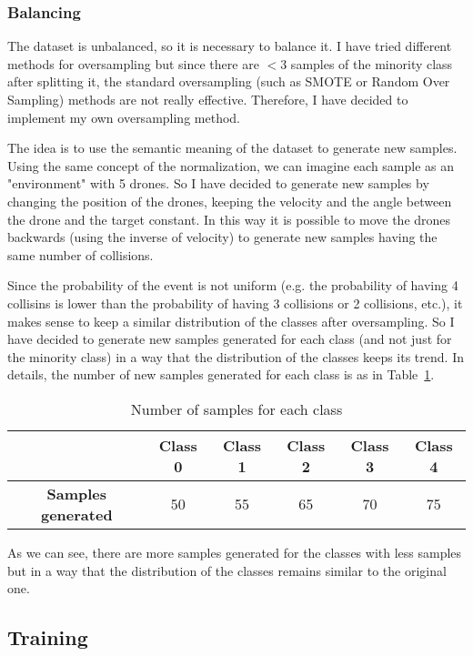 \subsubsection{Balancing} \label{sec:preprocessing-balancing}
The dataset is unbalanced, so it is necessary to balance it.
I have tried different methods for oversampling but since there are $<3$ samples of the minority class after splitting it, the standard oversampling (such as SMOTE or Random Over Sampling) methods are not really effective.
Therefore, I have decided to implement my own oversampling method.

The idea is to use the semantic meaning of the dataset to generate new samples.
Using the same concept of the normalization, we can imagine each sample as an "environment" with 5 drones.
So I have decided to generate new samples by changing the position of the drones, keeping the velocity and the angle between the drone and the target constant.
In this way it is possible to move the drones backwards (using the inverse of velocity) to generate new samples having the same number of collisions.

Since the probability of the event is not uniform (e.g. the probability of having 4 collisins is lower than the probability of having 3 collisions or 2 collisions, etc.), it makes sense to keep a similar distribution of the classes after oversampling.
So I have decided to generate new samples generated for each class (and not just for the minority class) in a way that the distribution of the classes keeps its trend.
In details, the number of new samples generated for each class is as in Table~\ref{tab:preprocessing-balancing}.
\begin{table}[h]
    \centering
    \begin{tabular}{|c|c|c|c|c|c|}
        \hline
        & \textbf{Class 0} & \textbf{Class 1} & \textbf{Class 2} & \textbf{Class 3} & \textbf{Class 4} \\ \hline
        \textbf{Samples generated} & 50 & 55 & 65 & 70 & 75 \\ \hline
    \end{tabular}
    \caption{Number of samples for each class}
    \label{tab:preprocessing-balancing}
\end{table}
As we can see, there are more samples generated for the classes with less samples but in a way that the distribution of the classes remains similar to the original one.

\subsection{Training} \label{sec:training}

